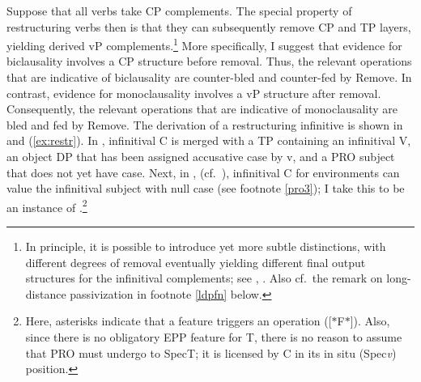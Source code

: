 \documentclass[output=paper]{langsci/langscibook}
\begin{document}
Suppose that all  verbs take CP complements.  The special property of
restructuring  verbs then is that they can subsequently remove CP and TP
layers, yielding derived vP complements.\footnote{In principle, it is possible
    to introduce yet more subtle distinctions, with different degrees of
    removal eventually yielding different final output structures for the
    infinitival complements; see \cite{Fanselow:91},
    \cite{Wurmbrand:01,Wurmbrand:15}. Also cf.\ the remark on long-distance
passivization in footnote \ref{ldpfn} below.} More specifically, I suggest that
evidence for biclausality involves a CP structure before removal. Thus, the
relevant operations that are indicative of biclausality are counter-bled and
counter-fed by Remove. In contrast, evidence for monoclausality involves a vP
structure after removal. Consequently, the relevant operations that are
indicative of monoclausality are bled and fed by Remove.  The derivation of a
restructuring  infinitive is shown in  and
(\ref{ex:restr}). In , infinitival C is merged with a TP
containing an infinitival V, an object DP that has been assigned accusative
case by v, and a PRO subject that does not yet have case. Next, in
, (cf.\ ), infinitival C for 
environments can value the infinitival subject with null case (see footnote
\ref{pro3}); I take this to be an instance of .\footnote{Here, asterisks
    indicate that a feature triggers an  operation ([$*$F$*$]).  Also,
    since there is no obligatory \gls{EPP} feature for  T, there is no reason
    to assume that PRO must undergo  to SpecT; it is licensed by C in
its in situ (Spec\emph{v}) position.}\newpage
\end{document}
